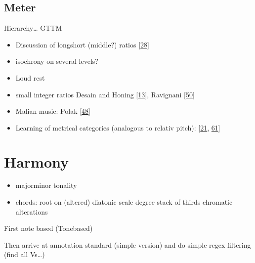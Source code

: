 \documentclass[letterpaper,10pt,english]{sphinxmanual}
\begin{document}
\section{Meter}
\label{\detokenize{4_time:meter}}
\sphinxAtStartPar
Hierarchy… GTTM
\begin{itemize}
\item {} 
\sphinxAtStartPar
Discussion of long\sphinxhyphen{}short (middle?) ratios {[}\hyperlink{cite.8_bibliography:id8}{28}{]}

\item {} 
\sphinxAtStartPar
isochrony on several levels?

\item {} 
\sphinxAtStartPar
Loud rest

\item {} 
\sphinxAtStartPar
small integer ratios Desain and Honing {[}\hyperlink{cite.8_bibliography:id11}{13}{]}, Ravignani  {[}\hyperlink{cite.8_bibliography:id9}{50}{]}

\item {} 
\sphinxAtStartPar
Malian music: Polak  {[}\hyperlink{cite.8_bibliography:id7}{48}{]}

\item {} 
\sphinxAtStartPar
Learning of metrical categories (analogous to relativ pitch): {[}\hyperlink{cite.8_bibliography:id35}{21}, \hyperlink{cite.8_bibliography:id36}{61}{]}

\end{itemize}


\chapter{Harmony}
\label{\detokenize{4_harmony:harmony}}\label{\detokenize{4_harmony::doc}}\begin{itemize}
\item {} 
\sphinxAtStartPar
major\sphinxhyphen{}minor tonality

\item {} 
\sphinxAtStartPar
chords:
\sphinxhyphen{} root on (altered) diatonic scale degree
\sphinxhyphen{} stack of thirds
\sphinxhyphen{} chromatic alterations

\end{itemize}

\sphinxAtStartPar
First note based (Tone\sphinxhyphen{}based)

\sphinxAtStartPar
Then arrive at annotation standard (simple version)
and do simple regex filtering (find all Vs…)
\end{document}
